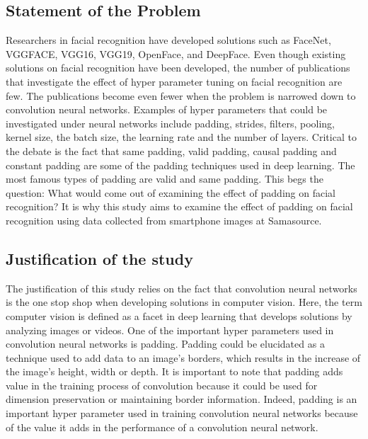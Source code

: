 \documentclass[
  12pt,
]{article}
\begin{document}
\subsection{Statement of the Problem}\label{statement-of-the-problem}

Researchers in facial recognition have developed solutions such as
FaceNet, VGGFACE, VGG16, VGG19, OpenFace, and DeepFace. Even though
existing solutions on facial recognition have been developed, the number
of publications that investigate the effect of hyper parameter tuning on
facial recognition are few. The publications become even fewer when the
problem is narrowed down to convolution neural networks. Examples of
hyper parameters that could be investigated under neural networks
include padding, strides, filters, pooling, kernel size, the batch size,
the learning rate and the number of layers. Critical to the debate is
the fact that same padding, valid padding, causal padding and constant
padding are some of the padding techniques used in deep learning. The
most famous types of padding are valid and same padding. This begs the
question: What would come out of examining the effect of padding on
facial recognition? It is why this study aims to examine the effect of
padding on facial recognition using data collected from smartphone
images at Samasource.

\subsection{Justification of the
study}\label{justification-of-the-study}

The justification of this study relies on the fact that convolution
neural networks is the one stop shop when developing solutions in
computer vision. Here, the term computer vision is defined as a facet in
deep learning that develops solutions by analyzing images or videos. One
of the important hyper parameters used in convolution neural networks is
padding. Padding could be elucidated as a technique used to add data to
an image's borders, which results in the increase of the image's height,
width or depth. It is important to note that padding adds value in the
training process of convolution because it could be used for dimension
preservation or maintaining border information. Indeed, padding is an
important hyper parameter used in training convolution neural networks
because of the value it adds in the performance of a convolution neural
network.
\end{document}
